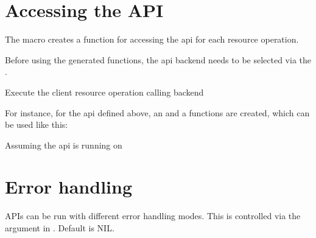 \documentclass[letterpaper,10pt,english]{sphinxmanual}
\begin{document}
\chapter{Accessing the API}
\label{\detokenize{api:accessing-the-api}}
The {\hyperref[\detokenize{api:macro:rest-server:define-api}]{}} macro creates a function for accessing the api for each resource operation.

Before using the generated functions, the api backend needs to be selected via the {\hyperref[\detokenize{api:macro:rest-server:with-api-backend}]{}}.

\begin{fulllineitems}
\label{\detokenize{api:macro:rest-server:with-api-backend}}
Execute the client resource operation calling backend

\end{fulllineitems}


For instance, for the api defined above, an  and a  functions are created, which can be used like this:

\begin{sphinxVerbatim}[commandchars=\\\{\}]
 
    
\end{sphinxVerbatim}

Assuming the api is running on 


\chapter{Error handling}
\label{\detokenize{error-handling:error-handling}}\label{\detokenize{error-handling::doc}}
APIs can be run with different error handling modes. This is controlled via the argument  in {\hyperref[\detokenize{api:function:rest-server:start-api}]{}}. Default is NIL.
\end{document}
